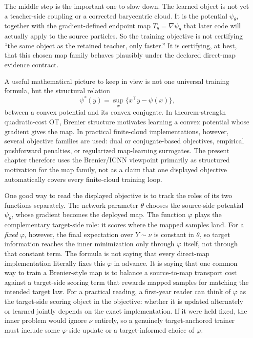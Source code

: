 The middle step is the important one to slow down.  The learned object is not yet
a teacher-side coupling or a corrected barycentric cloud.  It is the potential
\(\psi_\theta\), together with the gradient-defined endpoint map
\(T_\theta=\nabla\psi_\theta\) that later code will actually apply to the source
particles.  So the training objective is not certifying ``the same object as the
retained teacher, only faster.''  It is certifying, at best, that this chosen map
family behaves plausibly under the declared direct-map evidence contract.

A useful mathematical picture to keep in view is not one universal training
formula, but the structural relation
\begin{equation}
\label{eq:bf-neural-ot-direct-conjugate}
  \psi^*(y)=\sup_x\{x^\top y-\psi(x)\},
\end{equation}
between a convex potential and its convex conjugate.  In theorem-strength
quadratic-cost OT, Brenier structure motivates learning a convex potential whose
gradient gives the map.  In practical finite-cloud implementations, however,
several objective families are used: dual or conjugate-based objectives,
empirical pushforward penalties, or regularized map-learning surrogates.  The
present chapter therefore uses the Brenier/ICNN viewpoint primarily as
structured motivation for the map family, not as a claim that one displayed
objective automatically covers every finite-cloud training loop.

One good way to read the displayed objective is to track the roles of its two
functions separately.  The network parameter \(\theta\) chooses the source-side
potential \(\psi_\theta\), whose gradient becomes the deployed map.  The function
\(\varphi\) plays the complementary target-side role: it scores where the mapped
samples land.  For a \emph{fixed} \(\varphi\), however, the final expectation
over \(Y\sim\nu\) is constant in \(\theta\), so target information reaches the
inner minimization only through \(\varphi\) itself, not through that constant
term.
The formula is not saying that every direct-map implementation literally fixes this
\(\varphi\) in advance.  It is saying that one common way to train a Brenier-style
map is to balance a source-to-map transport cost against a target-side scoring term
that rewards mapped samples for matching the intended target law.  For a practical
reading, a first-year reader can think of \(\varphi\) as the target-side scoring
object in the objective: whether it is updated alternately or learned jointly depends on the exact
implementation.  If it were held fixed, the inner problem would ignore
\(\nu\) entirely, so a genuinely target-anchored trainer must include some
\(\varphi\)-side update or a target-informed choice of \(\varphi\).

